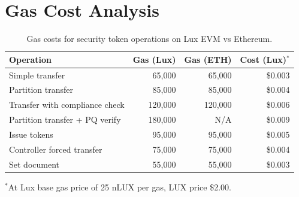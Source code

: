 \section{Gas Cost Analysis}
\label{sec:gas}

\begin{table}[H]
\centering
\caption{Gas costs for security token operations on Lux EVM vs Ethereum.}
\label{tab:gas}
\begin{tabular}{lrrr}
\toprule
\textbf{Operation} & \textbf{Gas (Lux)} & \textbf{Gas (ETH)} & \textbf{Cost (Lux)$^*$} \\
\midrule
Simple transfer & 65,000 & 65,000 & \$0.003 \\
Partition transfer & 85,000 & 85,000 & \$0.004 \\
Transfer with compliance check & 120,000 & 120,000 & \$0.006 \\
Partition transfer + PQ verify & 180,000 & N/A & \$0.009 \\
Issue tokens & 95,000 & 95,000 & \$0.005 \\
Controller forced transfer & 75,000 & 75,000 & \$0.004 \\
Set document & 55,000 & 55,000 & \$0.003 \\
\bottomrule
\end{tabular}
\end{table}

{\footnotesize $^*$At Lux base gas price of 25 nLUX per gas, LUX price \$2.00.}

